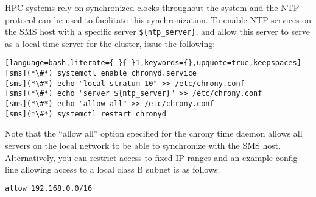 HPC systems rely on synchronized clocks throughout the system and the
NTP protocol can be used to facilitate this synchronization. To enable NTP
services on the SMS host with a specific server \texttt{\$\{ntp\_server\}}, and
allow this server to serve as a local time server for the cluster, 
issue the following:

\begin{lstlisting}[language=bash,literate={-}{-}1,keywords={},upquote=true,keepspaces]
[sms](*\#*) systemctl enable chronyd.service
[sms](*\#*) echo "local stratum 10" >> /etc/chrony.conf
[sms](*\#*) echo "server ${ntp_server}" >> /etc/chrony.conf
[sms](*\#*) echo "allow all" >> /etc/chrony.conf
[sms](*\#*) systemctl restart chronyd
\end{lstlisting}

\begin{center}
\begin{tcolorbox}[]
\small Note that the ``allow all'' option specified for the chrony time daemon
allows all servers on the local network to be able to synchronize with the SMS
host. Alternatively, you can restrict access to fixed IP ranges and an example
config line allowing access to a local class B subnet is as follows:
\begin{lstlisting}[language=bash]
allow 192.168.0.0/16
\end{lstlisting}
\end{tcolorbox}
\end{center}
